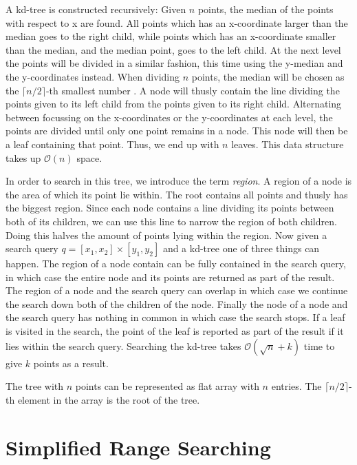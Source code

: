 A kd-tree is constructed recursively: Given $n$ points, the median of the points with respect to x are found. All points which has an x-coordinate larger than the median goes to the right child, while points which has an x-coordinate smaller than the median, and the median point, goes to the left child. At the next level the points will be divided in a similar fashion, this time using the y-median and the y-coordinates instead. When dividing $n$ points, the median will be chosen as the $\lceil n/2 \rceil$-th smallest number \cite{compgeo}. A node will thusly contain the line dividing the points given to its left child from the points given to its right child.
Alternating between focussing on the x-coordinates or the y-coordinates at each level, the points are divided until only one point remains in a node. This node will then be a leaf containing that point. Thus, we end up with $n$ leaves. This data structure takes up $\mathcal{O}(n)$ space.

In order to search in this tree, we introduce the term \emph{region}. A region of a node is the area of which its point lie within. The root contains all points and thusly has the biggest region. Since each node contains a line dividing its points between both of its children, we can use this line to narrow the region of both children. Doing this halves the amount of points lying within the region. Now given a search query $q = [x_1, x_2] \times [y_1, y_2]$ and a kd-tree one of three things can happen. The region of a node contain can be fully contained in the search query, in which case the entire node and its points are returned as part of the result. The region of a node and the search query can overlap in which case we continue the search down both of the children of the node. Finally the node of a node and the search query has nothing in common in which case the search stops. If a leaf is visited in the search, the point of the leaf is reported as part of the result if it lies within the search query. Searching the kd-tree takes $\mathcal{O}(\sqrt{n} + k)$ time to give $k$ points as a result.


The tree with $n$ points can be represented as flat array with $n$ entries. The $\lceil n/2 \rceil$-th element in the array is the root of the tree. 


\section{Simplified Range Searching}


